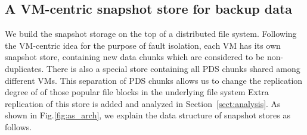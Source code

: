 



\subsection{A VM-centric snapshot store for backup data}

We build the snapshot storage on the top of a distributed file system.
Following the VM-centric idea for the purpose of fault isolation,
each VM has its own snapshot store, containing new data chunks which are considered
to be non-duplicates.
There is also a special store containing all PDS chunks shared among different VMs.
This separation of PDS chunks allows us to change the replication degree of of those popular file blocks in the underlying file system
Extra replication of this store is added and analyzed in Section~\ref{sect:analysis}.
As shown in Fig.\ref{fig:as_arch}, we explain the data structure of snapshot stores as follows.

